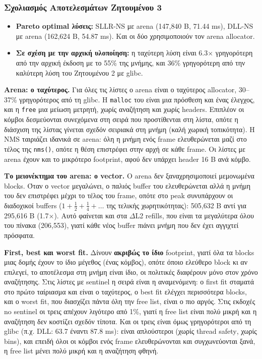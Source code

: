 \documentclass[11pt,a4paper]{article}
\newcommand{\en}[1]{\textlatin{#1}}
\begin{document}
\subsubsection*{Σχολιασμός Αποτελεσμάτων Ζητουμένου 3}
\begin{itemize}
    \item \textbf{\en{Pareto optimal} λύσεις:} \en{SLLR-NS} με \en{arena} (147{,}840 \en{B}, 71.44 \en{ms}), \en{DLL-NS} με \en{arena} (162{,}624 \en{B}, 54.87 \en{ms}). Και οι δύο χρησιμοποιούν τον \en{arena allocator}.
    \item \textbf{Σε σχέση με την αρχική υλοποίηση:} η ταχύτερη λύση είναι 6.3$\times$ γρηγορότερη από την αρχική έκδοση με το 55\% της μνήμης, και 36\% γρηγορότερη από την καλύτερη λύση του Ζητουμένου 2 με \en{glibc}.
\end{itemize}

\textbf{\en{Arena}: ο ταχύτερος.} Για όλες τις λίστες ο \en{arena} είναι ο ταχύτερος \en{allocator}, 30--37\% γρηγορότερος από τη \en{glibc}. Η \en{\texttt{malloc}} του είναι μια πρόσθεση και ένας έλεγχος, και η \en{\texttt{free}} μια μείωση μετρητή, χωρίς αναζήτηση και χωρίς \en{headers}. Επιπλέον οι κόμβοι δεσμεύονται συνεχόμενα στη σειρά που προστίθενται στη λίστα, οπότε η διάσχιση της λίστας γίνεται σχεδόν σειριακά στη μνήμη (καλή χωρική τοπικότητα). Η \en{NMS} ταιριάζει ιδανικά σε \en{arena}: όλη η μνήμη ενός \en{frame} ελευθερώνεται μαζί στο τέλος της \en{\texttt{nms()}}, οπότε η θέση επιστρέφει στην αρχή σε κάθε \en{frame}. Οι λίστες με \en{arena} έχουν και το μικρότερο \en{footprint}, αφού δεν υπάρχει \en{header} 16 \en{B} ανά κόμβο.

\textbf{Το μειονέκτημα του \en{arena}: ο \en{vector}.} Ο \en{arena} δεν ξαναχρησιμοποιεί μεμονωμένα \en{blocks}. Όταν ο \en{vector} μεγαλώνει, ο παλιός \en{buffer} του ελευθερώνεται αλλά η μνήμη του δεν επιστρέφει μέχρι το τέλος του \en{frame}, οπότε στο \en{peak} συνυπάρχουν οι διαδοχικοί \en{buffers} ($1 + \tfrac12 + \tfrac14 + \dots$ της τελικής χωρητικότητας): 505{,}632 \en{B} αντί για 295{,}616 \en{B} (1.7$\times$). Αυτό φαίνεται και στα \en{$\Delta$L2 refills}, που είναι τα μεγαλύτερα όλου του πίνακα (206{,}553), γιατί κάθε νέος \en{buffer} πιάνει μνήμη που δεν έχει αγγιχτεί πρόσφατα.

\textbf{\en{First}, \en{best} και \en{worst fit}.} Δίνουν \textbf{ακριβώς το ίδιο} \en{footprint}, γιατί όλα τα \en{blocks} μιας δομής έχουν το ίδιο μέγεθος (ένας κόμβος), οπότε όποιο ελεύθερο \en{block} κι αν επιλεγεί, το αποτέλεσμα στη μνήμη είναι ίδιο, οι πολιτικές διαφέρουν μόνο στον χρόνο αναζήτησης. Στις λίστες με \en{sentinel} η σειρά είναι η αναμενόμενη: ο \en{first fit} σταματά στο πρώτο ταίριασμα και είναι ο ταχύτερος, ο \en{best fit} ελέγχει περισσότερα \en{blocks}, και ο \en{worst fit}, που διασχίζει πάντα όλη την \en{free list}, είναι ο πιο αργός. Στις εκδοχές \en{no sentinel} οι τρεις απέχουν λιγότερο από 1\%, γιατί η \en{free list} είναι πολύ μικρή και η αναζήτηση δεν κοστίζει σχεδόν τίποτα. Και οι τρεις είναι όμως γρηγορότεροι από τη \en{glibc} (π.χ. \en{DLL}: 63.7 έναντι 87.8 \en{ms}): είναι απλούστεροι (χωρίς \en{thread safety}, χωρίς \en{bins}), και επειδή όλοι οι κόμβοι ενός \en{frame} ελευθερώνονται και συγχωνεύονται ξανά, η \en{free list} μένει πολύ μικρή και η αναζήτηση φθηνή.
\end{document}
